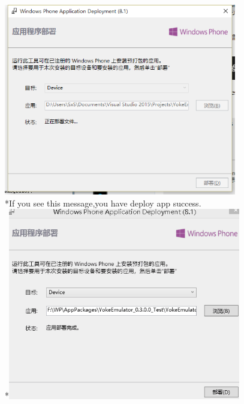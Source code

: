 \documentclass[12pt,a4paper]{article}
\begin{document}
\begin{CJK}{UTF8}{gbsn}
\begin{enumerate}
\\\includegraphics[width=4in]{install_deployment.png}
\\*If you see this message,you have deploy app success.
\\*\includegraphics[width=4in]{install_deployment_success.png}
\end{enumerate}

\newpage

\end{CJK}
\end{document}
